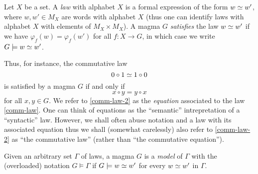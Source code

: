 \begin{definition}[Law]\label{law-def}
  \leanok
  Let $X$ be a set. A \emph{law} with alphabet $X$ is a formal expression of the form $w \simeq w'$,
  where $w, w' \in M_X$ are words with alphabet $X$ (thus one can identify laws with alphabet $X$
  with elements of $M_X \times M_X$).  A magma $G$ \emph{satisfies} the law $w \simeq w'$ if
  we have $\varphi_f( w ) = \varphi_f ( w' )$ for all $f: X \to G$, in which case we write
  $G \models w \simeq w'$.
\end{definition}

Thus, for instance, the commutative law
\begin{equation}\label{comm-law}
  0 \circ 1 \simeq 1 \circ 0
\end{equation}
is satisfied by a magma $G$ if and only if
\begin{equation}\label{comm-law-2}
 x \circ y = y \circ x
\end{equation}
for all $x, y \in G$.  We refer to \eqref{comm-law-2} as the \emph{equation} associated to the law \eqref{comm-law}.  One can think of equations as the ``semantic'' intrepretation of a ``syntactic'' law.  However, we shall often abuse notation and a law with its associated equation thus we shall (somewhat carelessly) also refer to \eqref{comm-law-2} as ``the commutative law'' (rather than ``the commutative equation'').

\begin{definition}[Models]\label{models-def}
  \leanok
  Given an arbitrary set $\Gamma$ of laws, a magma $G$ is a \emph{model} of $\Gamma$ with the
  (overloaded) notation $G\models\Gamma$ if $G\models w\simeq w'$ for every $w\simeq w'$ in $\Gamma$.
\end{definition}

